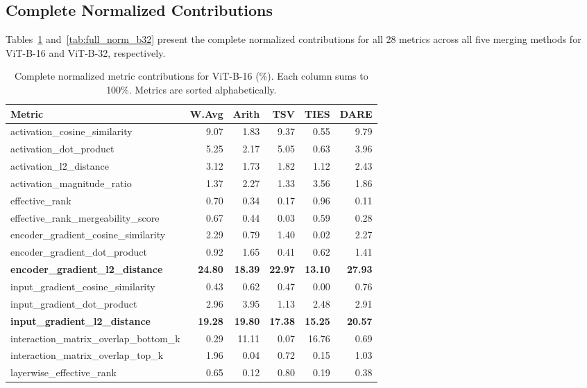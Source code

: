 \subsection{Complete Normalized Contributions}

Tables~\ref{tab:full_norm_b16} and~\ref{tab:full_norm_b32} present the complete normalized contributions for all 28 metrics across all five merging methods for ViT-B-16 and ViT-B-32, respectively.

\begin{table}[h]
\centering
\caption{Complete normalized metric contributions for ViT-B-16 (\%). Each column sums to 100\%. Metrics are sorted alphabetically.}
\label{tab:full_norm_b16}
\small
\begin{tabular}{lrrrrr}
\toprule
\textbf{Metric} & \textbf{W.Avg} & \textbf{Arith} & \textbf{TSV} & \textbf{TIES} & \textbf{DARE} \\
\midrule
activation\_cosine\_similarity & 9.07 & 1.83 & 9.37 & 0.55 & 9.79 \\
activation\_dot\_product & 5.25 & 2.17 & 5.05 & 0.63 & 3.96 \\
activation\_l2\_distance & 3.12 & 1.73 & 1.82 & 1.12 & 2.43 \\
activation\_magnitude\_ratio & 1.37 & 2.27 & 1.33 & 3.56 & 1.86 \\
effective\_rank & 0.70 & 0.34 & 0.17 & 0.96 & 0.11 \\
effective\_rank\_mergeability\_score & 0.67 & 0.44 & 0.03 & 0.59 & 0.28 \\
encoder\_gradient\_cosine\_similarity & 2.29 & 0.79 & 1.40 & 0.02 & 2.27 \\
encoder\_gradient\_dot\_product & 0.92 & 1.65 & 0.41 & 0.62 & 1.41 \\
\textbf{encoder\_gradient\_l2\_distance} & \textbf{24.80} & \textbf{18.39} & \textbf{22.97} & \textbf{13.10} & \textbf{27.93} \\
input\_gradient\_cosine\_similarity & 0.43 & 0.62 & 0.47 & 0.00 & 0.76 \\
input\_gradient\_dot\_product & 2.96 & 3.95 & 1.13 & 2.48 & 2.91 \\
\textbf{input\_gradient\_l2\_distance} & \textbf{19.28} & \textbf{19.80} & \textbf{17.38} & \textbf{15.25} & \textbf{20.57} \\
interaction\_matrix\_overlap\_bottom\_k & 0.29 & 11.11 & 0.07 & 16.76 & 0.69 \\
interaction\_matrix\_overlap\_top\_k & 1.96 & 0.04 & 0.72 & 0.15 & 1.03 \\
layerwise\_effective\_rank & 0.65 & 0.12 & 0.80 & 0.19 & 0.38 \\

\end{tabular}
\end{table}

